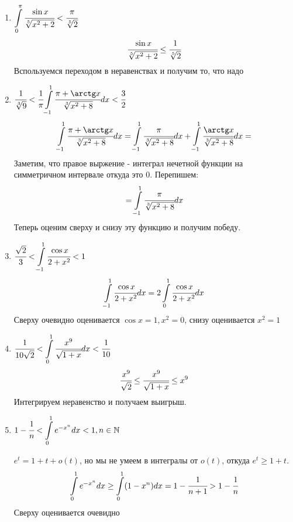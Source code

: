 \begin{enumerate}
    \item $\displaystyle\int\limits_{0}^{\pi}\cfrac{\sin x }{\sqrt[5]{x^2+2}}<\cfrac{\pi}{\sqrt[5]{2}}$
    $$\cfrac{\sin x}{\sqrt[5]{x^2+2}}\leq \cfrac{1}{\sqrt[5]{2}}$$
    Вспользуемся переходом в неравенствах и получим то, что надо
    
    \item $\cfrac{1}{\sqrt[3]{9}}<\cfrac{1}{\pi}\integral{-1}{1}\cfrac{\pi + \arctg x}{\sqrt[3]{x^2+8}}dx < \cfrac{3}{2}$
    $$\integral{-1}{1}\cfrac{\pi + \arctg x}{\sqrt[3]{x^2+8}}dx =\integral{-1}{1}\cfrac{\pi}{\sqrt[3]{x^2+8}}dx + \integral{-1}{1}\cfrac{\arctg x}{\sqrt[3]{x^2+8}}dx =$$
    Заметим, что правое выржение - интеграл нечетной функции на симметричном интервале откуда это 0. Перепишем:
    $$=\displaystyle\int\limits_{-1}^{1}\cfrac{\pi}{\sqrt[3]{x^2+8}}dx$$
    Теперь оценим сверху и снизу эту функцию и получим победу.
    \item $\cfrac{\sqrt{2}}{3}< \displaystyle\int\limits_{-1}^{1}\cfrac{\cos x}{2+x^2}<1$
    $$\displaystyle\int\limits_{-1}^{1}\cfrac{\cos x}{2+x^2}dx = 2 \displaystyle\int\limits_{0}^{1}\cfrac{\cos x}{2+x^2}dx$$
    Сверху очевидно оценивается $\cos x = 1, x^2 = 0$, снизу оценивается $x^2 = 1$
    \item $\cfrac{1}{10\sqrt{2}}<\displaystyle\int\limits_{0}^{1}\cfrac{x^9}{\sqrt{1+x}}dx<\cfrac{1}{10}$
    $$\cfrac{x^9}{\sqrt{2}}\leq \cfrac{x^9}{\sqrt{1+x}}\leq x^9$$
    Интегрируем неравенство и получаем выигрыш.

    \item $1-\cfrac{1}{n}< \displaystyle\int\limits_{0}^{1}e^{-x^n}dx<1, n \in \mathbb{N}$

    $e^t = 1+ t + o(t)$, но мы не умеем в интегралы от $o(t)$, откуда $e^t \geq 1+t$. 
    $$\displaystyle\int\limits_{0}^{1}e^{-x^n}dx \geq \displaystyle\int\limits_{0}^{1}(1-x^n)dx = 1- \cfrac{1}{n+1} > 1- \cfrac{1}{n}$$
    Сверху оценивается очевидно
    
\end{enumerate}
